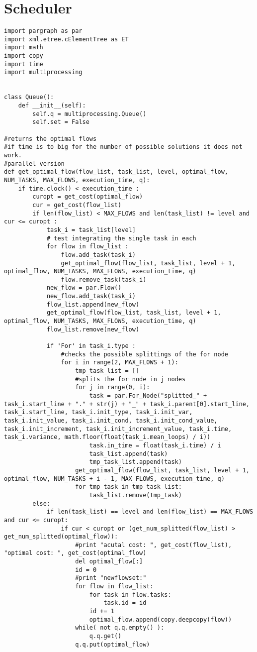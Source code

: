 \documentclass[a4paper,10pt,twoside]{book}
\begin{document}
\section{Scheduler}
\begin{lstlisting}[language=CCC, caption=schedule.py]
import pargraph as par
import xml.etree.cElementTree as ET
import math
import copy
import time
import multiprocessing


class Queue():
	def __init__(self):
		self.q = multiprocessing.Queue()
		self.set = False

#returns the optimal flows 
#if time is to big for the number of possible solutions it does not work.
#parallel version
def get_optimal_flow(flow_list, task_list, level, optimal_flow, NUM_TASKS, MAX_FLOWS, execution_time, q):
	if time.clock() < execution_time :
		curopt = get_cost(optimal_flow)
		cur = get_cost(flow_list)
		if len(flow_list) < MAX_FLOWS and len(task_list) != level and cur <= curopt :
			task_i = task_list[level]
			# test integrating the single task in each
			for flow in flow_list :
				flow.add_task(task_i)
				get_optimal_flow(flow_list, task_list, level + 1, optimal_flow, NUM_TASKS, MAX_FLOWS, execution_time, q)
				flow.remove_task(task_i)
			new_flow = par.Flow()		
			new_flow.add_task(task_i)
			flow_list.append(new_flow)
			get_optimal_flow(flow_list, task_list, level + 1, optimal_flow, NUM_TASKS, MAX_FLOWS, execution_time, q)
			flow_list.remove(new_flow)
			
			if 'For' in task_i.type :
				#checks the possible splittings of the for node
				for i in range(2, MAX_FLOWS + 1):
					tmp_task_list = []
					#splits the for node in j nodes
					for j in range(0, i):
						task = par.For_Node("splitted_" + task_i.start_line + "." + str(j) + "_" + task_i.parent[0].start_line, task_i.start_line, task_i.init_type, task_i.init_var, task_i.init_value, task_i.init_cond, task_i.init_cond_value, task_i.init_increment, task_i.init_increment_value, task_i.time, task_i.variance, math.floor(float(task_i.mean_loops) / i))
						task.in_time = float(task_i.time) / i
						task_list.append(task)
						tmp_task_list.append(task)
					get_optimal_flow(flow_list, task_list, level + 1, optimal_flow, NUM_TASKS + i - 1, MAX_FLOWS, execution_time, q)
					for tmp_task in tmp_task_list:
						task_list.remove(tmp_task)		
		else:
			if len(task_list) == level and len(flow_list) == MAX_FLOWS and cur <= curopt:
				if cur < curopt or (get_num_splitted(flow_list) > get_num_splitted(optimal_flow)):
					#print "acutal cost: ", get_cost(flow_list), "optimal cost: ", get_cost(optimal_flow)
					del optimal_flow[:]
					id = 0
					#print "newflowset:"
					for flow in flow_list:
						for task in flow.tasks:
							task.id = id
						id += 1
						optimal_flow.append(copy.deepcopy(flow))
					while( not q.q.empty() ):
						q.q.get()
					q.q.put(optimal_flow)
	

\end{lstlisting}
\end{document}

